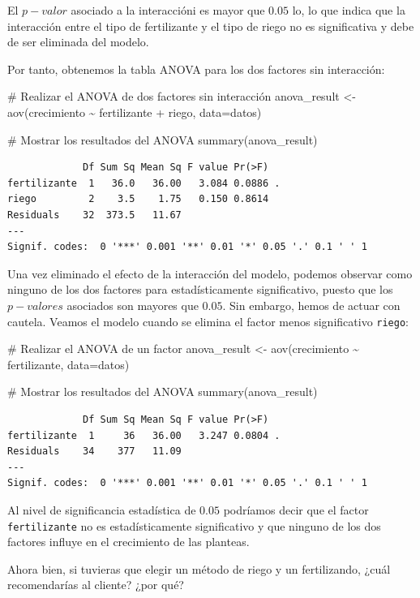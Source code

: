 \documentclass[
  letterpaper,
  DIV=11,
  numbers=noendperiod]{scrreprt}
\newenvironment{Shaded}{\begin{snugshade}}{\end{snugshade}}
\newcommand{\AttributeTok}[1]{\textcolor[rgb]{0.40,0.45,0.13}{#1}}
\newcommand{\CommentTok}[1]{\textcolor[rgb]{0.37,0.37,0.37}{#1}}
\newcommand{\FunctionTok}[1]{\textcolor[rgb]{0.28,0.35,0.67}{#1}}
\newcommand{\NormalTok}[1]{\textcolor[rgb]{0.00,0.23,0.31}{#1}}
\newcommand{\OtherTok}[1]{\textcolor[rgb]{0.00,0.23,0.31}{#1}}
\newcommand{\SpecialCharTok}[1]{\textcolor[rgb]{0.37,0.37,0.37}{#1}}
\begin{document}
\begin{tcolorbox}
El \(p-valor\) asociado a la interaccióni es mayor que \(0.05\) lo, lo
que indica que la interacción entre el tipo de fertilizante y el tipo de
riego no es significativa y debe de ser eliminada del modelo.

Por tanto, obtenemos la tabla ANOVA para los dos factores sin
interacción:

\begin{Shaded}
\begin{Highlighting}[]
\CommentTok{\# Realizar el ANOVA de dos factores sin interacción}
\NormalTok{anova\_result }\OtherTok{\textless{}{-}} \FunctionTok{aov}\NormalTok{(crecimiento }\SpecialCharTok{\textasciitilde{}}\NormalTok{ fertilizante }\SpecialCharTok{+}\NormalTok{ riego, }\AttributeTok{data=}\NormalTok{datos)}

\CommentTok{\# Mostrar los resultados del ANOVA}
\FunctionTok{summary}\NormalTok{(anova\_result)}
\end{Highlighting}
\end{Shaded}

\begin{verbatim}
             Df Sum Sq Mean Sq F value Pr(>F)  
fertilizante  1   36.0   36.00   3.084 0.0886 .
riego         2    3.5    1.75   0.150 0.8614  
Residuals    32  373.5   11.67                 
---
Signif. codes:  0 '***' 0.001 '**' 0.01 '*' 0.05 '.' 0.1 ' ' 1
\end{verbatim}

Una vez eliminado el efecto de la interacción del modelo, podemos
observar como ninguno de los dos factores para estadísticamente
significativo, puesto que los \(p-valores\) asociados son mayores que
\(0.05\). Sin embargo, hemos de actuar con cautela. Veamos el modelo
cuando se elimina el factor menos significativo \texttt{riego}:

\begin{Shaded}
\begin{Highlighting}[]
\CommentTok{\# Realizar el ANOVA de un factor}
\NormalTok{anova\_result }\OtherTok{\textless{}{-}} \FunctionTok{aov}\NormalTok{(crecimiento }\SpecialCharTok{\textasciitilde{}}\NormalTok{ fertilizante, }\AttributeTok{data=}\NormalTok{datos)}

\CommentTok{\# Mostrar los resultados del ANOVA}
\FunctionTok{summary}\NormalTok{(anova\_result)}
\end{Highlighting}
\end{Shaded}

\begin{verbatim}
             Df Sum Sq Mean Sq F value Pr(>F)  
fertilizante  1     36   36.00   3.247 0.0804 .
Residuals    34    377   11.09                 
---
Signif. codes:  0 '***' 0.001 '**' 0.01 '*' 0.05 '.' 0.1 ' ' 1
\end{verbatim}

Al nivel de significancia estadística de \(0.05\) podríamos decir que el
factor \texttt{fertilizante} no es estadísticamente significativo y que
ninguno de los dos factores influye en el crecimiento de las planteas.

Ahora bien, si tuvieras que elegir un método de riego y un fertilizando,
¿cuál recomendarías al cliente? ¿por qué?

\end{tcolorbox}
\end{document}
